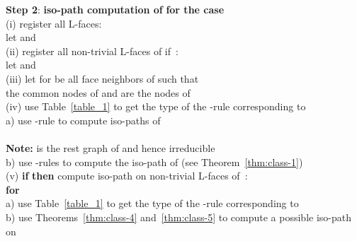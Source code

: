 \documentclass[a4paper,11pt]{article}
\begin{document}
\noindent\mbox{}\hspace{0.3cm}    {\bf Step 2}: {\bf iso-path computation of} 
{\bf for the case} \\
\mbox{}\hspace{0.6cm}      (i) register all L-faces: \\
\mbox{}\hspace{1.2cm}          let  and \\
\mbox{}\hspace{0.6cm}      (ii) register all non-trivial L-faces of  if \,:\\
\mbox{}\hspace{1.2cm}           let  and \\
\mbox{}\hspace{0.6cm}      (iii) let  for  be all face neighbors of  such that \\
\mbox{}\hspace{1.4cm}            the common nodes of  and  are the nodes of \\
\mbox{}\hspace{0.6cm}      (iv) use Table~\ref{table_1} to get the type of the -rule corresponding to \\
\mbox{}\hspace{1.3cm}            a) use -rule to compute iso-paths of  \\
\mbox{} \hspace{1.7cm}              \\
\mbox{} \hspace{1.7cm}              {\bf Note: } is the rest graph of  and hence irreducible\\
\mbox{}\hspace{1.3cm}            b) use -rules to compute the iso-path of  (see Theorem~\ref{thm:class-1})\\
\mbox{}\hspace{0.6cm}     (v) {\bf if}  {\bf then} compute iso-path on non-trivial L-faces of \,:\\
\mbox{}\hspace{1.2cm}         {\bf for} \\
\mbox{}\hspace{1.7cm}             a) use Table~\ref{table_1} to get the type of the -rule corresponding to \\
\mbox{}\hspace{1.7cm}             b) use Theorems~\ref{thm:class-4} and~\ref{thm:class-5} to compute a possible iso-path on\\
\mbox{}\hspace{2.27cm}                \\
\end{document}
